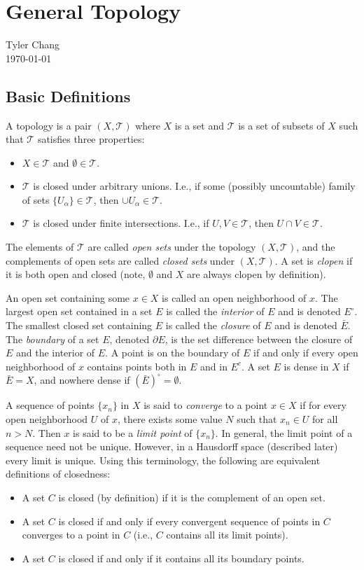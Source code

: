 \documentclass[12pt]{article}
\begin{document}
\section*{General Topology}
Tyler Chang\\
\today

\subsection*{Basic Definitions}

A topology is a pair $(X, \mathcal{T})$ where $X$ is a set and $\mathcal{T}$ is a set of
subsets of $X$ such that $\mathcal{T}$ satisfies three properties:
\begin{itemize}
\item $X \in \mathcal{T}$ and $\emptyset \in \mathcal{T}$.
\item $\mathcal{T}$ is closed under arbitrary unions. I.e., if some 
(possibly uncountable) family of sets $\{U_\alpha\}\in \mathcal{T}$, then 
$\cup U_\alpha \in \mathcal{T}$.
\item $\mathcal{T}$ is closed under finite intersections.
I.e., if $U, V \in \mathcal{T}$, then $U \cap V \in \mathcal{T}$.
\end{itemize}

The elements of $\mathcal{T}$ are called {\it open sets} under the topology 
$(X, \mathcal{T})$, and the complements of open sets are called 
{\it closed sets} under $(X, \mathcal{T})$.
A set is {\it clopen} if it is both open and closed (note, $\emptyset$ and $X$
are always clopen by definition).

An open set containing some $x \in X$ is called an open neighborhood of $x$.
The largest open set contained in a set $E$ is called the {\it interior} of $E$
and is denoted $E^\circ$.
The smallest closed set containing $E$ is called the {\it closure} of $E$ and
is denoted $\bar{E}$.
The {\it boundary} of a set $E$, denoted $\partial E$, is the set difference 
between the closure of $E$ and the interior of $E$.
A point is on the boundary of $E$ if and only if every open neighborhood of $x$
contains points both in $E$ and in $E^c$.
A set $E$ is dense in $X$ if $\bar{E} = X$, and nowhere dense if
$\left(\bar{E}\right)^\circ = \emptyset$.

A sequence of points $\{x_n\}$ in $X$ is said to {\it converge} to a point 
$x \in X$ if for every open neighborhood $U$ of $x$, there exists some value 
$N$ such that $x_n \in U$ for all $n > N$.
Then $x$ is said to be a {\it limit point} of $\{x_n\}$.
In general, the limit point of a sequence need not be unique.
However, in a Hausdorff space (described later) every limit is unique.
Using this terminology, the following are equivalent definitions of closedness:
\begin{itemize}
\item A set $C$ is closed (by definition) if it is the complement of an open
set.
\item A set $C$ is closed if and only if every convergent sequence of points 
in $C$ converges to a point in $C$ (i.e., $C$ contains all its limit points).
\item A set $C$ is closed if and only if it contains all its boundary points.
\end{itemize}
\end{document}

